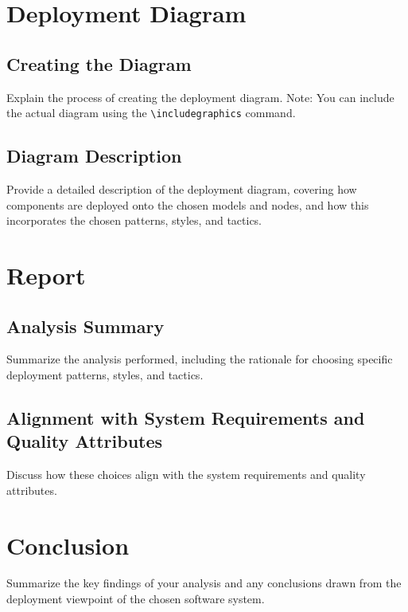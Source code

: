 \documentclass{article}
\begin{document}
\section{Deployment Diagram}
\subsection{Creating the Diagram}
Explain the process of creating the deployment diagram. Note: You can include the actual diagram using the \texttt{\textbackslash includegraphics} command.
\subsection{Diagram Description}
Provide a detailed description of the deployment diagram, covering how components are deployed onto the chosen models and nodes, and how this incorporates the chosen patterns, styles, and tactics.

\section{Report}
\subsection{Analysis Summary}
Summarize the analysis performed, including the rationale for choosing specific deployment patterns, styles, and tactics.
\subsection{Alignment with System Requirements and Quality Attributes}
Discuss how these choices align with the system requirements and quality attributes.

\section{Conclusion}
Summarize the key findings of your analysis and any conclusions drawn from the deployment viewpoint of the chosen software system.
\end{document}
